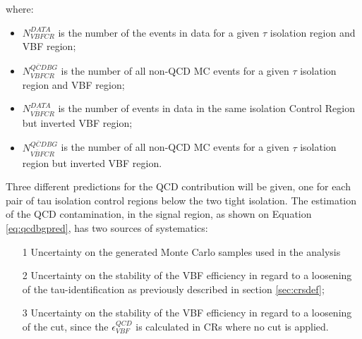 where:

\begin{itemize}
\item $N^{DATA}_{VBF CR}$ is the number of the events in data for a given $ \tau $ isolation region and VBF region;
\item $N^{\overline{QCD} BG}_{VBFCR}$ is the number of all non-QCD MC events for a given $ \tau $ isolation region and VBF region;
\item $N^{DATA}_{\overline{VBF}CR}$ is the number of events in data in the same isolation Control Region but inverted VBF region;
\item $N^{\overline{QCD} BG}_{\overline{VBF}CR}$ is the number of all non-QCD MC events for a given $ \tau $ isolation region but inverted VBF region.
\end{itemize}

Three different predictions for the QCD contribution will be given, one for each pair of tau isolation control regions below the two tight isolation. The estimation of the QCD contamination, in the signal region,  as shown on Equation \ref{eq:qcdbgpred}, has two sources of systematics:  

\begin{itemize}
	\item[1]Uncertainty on the generated Monte Carlo samples used in the analysis
	\item[2]  Uncertainty on the stability of the VBF efficiency in regard to a loosening of the tau-identification as previously described in section \ref{sec:crsdef};
	\item[3] Uncertainty on the stability of the VBF efficiency in regard to a loosening of the \met cut, since the $\epsilon^{QCD}_{VBF}$ is calculated in CRs where no \met cut is applied.
\end{itemize}

